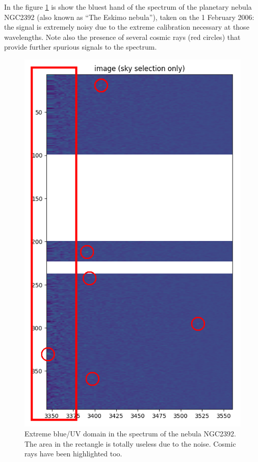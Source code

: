 In the figure \ref{fig:10_det} is show the bluest hand of the spectrum of the planetary nebula NGC2392 (also known as ``The Eskimo nebula''), taken on the 1 February 2006: the signal is extremely noisy due to the extreme calibration necessary at those wavelengths. Note also the presence of several cosmic rays (red circles) that provide further spurious signals to the spectrum.
\begin{figure}[h!]
	\centering
	\includegraphics[width=.4\textwidth,angle=90]{./5_mywork/10_det}
	\caption{Extreme blue/UV domain in the spectrum of the nebula NGC2392. The area in the rectangle is totally useless due to the noise. Cosmic rays have been highlighted too. \label{fig:10_det}}
\end{figure}

